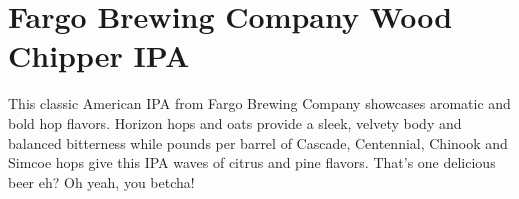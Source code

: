 \documentclass[10pt,oneside]{scrbook}
\begin{document}
\pagebreak

\begin{ingredientsblock}

\begin{malts}
\end{malts}

\begin{hops}

\end{hops}

\begin{yeasts}
\end{yeasts}

\end{ingredientsblock}

\chapter*{Fargo Brewing Company Wood Chipper IPA}

\begin{aboutblock}
This classic American IPA from Fargo Brewing Company showcases aromatic and bold
hop flavors. Horizon hops and oats provide a sleek, velvety body and balanced bitterness
while pounds per barrel of Cascade, Centennial, Chinook and Simcoe hops give this IPA
waves of citrus and pine flavors. That's one delicious beer eh? Oh yeah, you betcha!
\end{aboutblock}


\begin{methodandtiming}
 
\begin{mashsteps}
\end{mashsteps}

\end{methodandtiming}

\pagebreak
\end{document}
